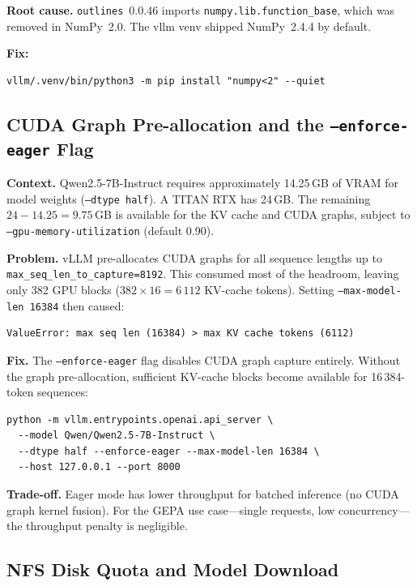 \documentclass[11pt,a4paper]{article}
\begin{document}
\textbf{Root cause.}
\texttt{outlines}~0.0.46 imports \texttt{numpy.lib.function\_base}, which was
removed in NumPy~2.0.
The vllm venv shipped NumPy~2.4.4 by default.

\textbf{Fix:}
\begin{lstlisting}[style=shell]
vllm/.venv/bin/python3 -m pip install "numpy<2" --quiet
\end{lstlisting}

\subsection{CUDA Graph Pre-allocation and the \texttt{--enforce-eager} Flag}
\label{sec:enforce_eager}

\textbf{Context.}
Qwen2.5-7B-Instruct requires approximately 14.25\,GB of VRAM for model
weights (\texttt{--dtype half}).
A TITAN RTX has 24\,GB.
The remaining $24 - 14.25 = 9.75$\,GB is available for the KV cache and
CUDA graphs, subject to \texttt{--gpu-memory-utilization} (default 0.90).

\textbf{Problem.}
vLLM pre-allocates CUDA graphs for all sequence lengths up to
\texttt{max\_seq\_len\_to\_capture=8192}.
This consumed most of the headroom, leaving only 382 GPU blocks
($382 \times 16 = 6\,112$ KV-cache tokens).
Setting \texttt{--max-model-len 16384} then caused:
\begin{lstlisting}[style=shell]
ValueError: max seq len (16384) > max KV cache tokens (6112)
\end{lstlisting}

\textbf{Fix.}
The \texttt{--enforce-eager} flag disables CUDA graph capture entirely.
Without the graph pre-allocation, sufficient KV-cache blocks become
available for 16\,384-token sequences:
\begin{lstlisting}[style=shell]
python -m vllm.entrypoints.openai.api_server \
  --model Qwen/Qwen2.5-7B-Instruct \
  --dtype half --enforce-eager --max-model-len 16384 \
  --host 127.0.0.1 --port 8000
\end{lstlisting}

\textbf{Trade-off.}
Eager mode has lower throughput for batched inference (no CUDA graph
kernel fusion).
For the GEPA use case---single requests, low concurrency---the throughput
penalty is negligible.

\subsection{NFS Disk Quota and Model Download}
\label{sec:nfs}
\end{document}
